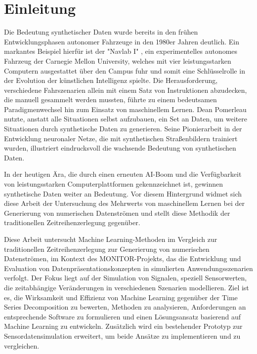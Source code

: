 
\chapter{Einleitung}
Die Bedeutung synthetischer Daten wurde bereits in den frühen Entwicklungsphasen autonomer Fahrzeuge in den 1980er Jahren deutlich. 
Ein markantes Beispiel hierfür ist der "Navlab I" \cite{NeuralNe96:online}, ein experimentelles autonomes Fahrzeug der Carnegie Mellon University, welches mit vier leistungsstarken Computern ausgestattet 
über den Campus fuhr und somit eine Schlüsselrolle in der Evolution der künstlichen Intelligenz spielte. Die Herausforderung, verschiedene Fahrszenarien allein mit einem Satz von Instruktionen abzudecken, 
die manuell gesammelt werden mussten, führte zu einem bedeutsamen Paradigmenwechsel hin zum Einsatz von maschinellem Lernen. Dean Pomerleau nutzte, anstatt alle Situationen selbst aufzubauen, ein Set an Daten, 
um weitere Situationen durch synthetische Daten zu generieren. Seine Pionierarbeit in der Entwicklung neuronaler Netze, die mit synthetischen Straßenbildern trainiert wurden, illustriert eindrucksvoll die wachsende Bedeutung von synthetischen Daten.

In der heutigen Ära, die durch einen erneuten AI-Boom und die Verfügbarkeit von leistungsstarken Computerplattformen gekennzeichnet ist, gewinnen synthetische Daten weiter an Bedeutung. Vor diesem Hintergrund widmet 
sich diese Arbeit der Untersuchung des Mehrwerts von maschinellem Lernen bei der Generierung von numerischen Datenströmen und stellt diese Methodik der traditionellen Zeitreihenzerlegung gegenüber.

Diese Arbeit untersucht Machine Learning-Methoden im Vergleich zur traditionellen Zeitreihenzerlegung zur Generierung von numerischen Datenströmen, im Kontext des MONITOR-Projekts, das die Entwicklung und Evaluation 
von Datenpräsentationskonzepten in simulierten Anwendungsszenarien verfolgt. Der Fokus liegt auf der Simulation von Signalen, speziell Sensorwerten, die zeitabhängige Veränderungen in verschiedenen Szenarien modellieren. 
Ziel ist es, die Wirksamkeit und Effizienz von Machine Learning gegenüber der Time Series Decomposition zu bewerten, Methoden zu analysieren, Anforderungen an entsprechende Software zu formulieren und einen Lösungsansatz 
basierend auf Machine Learning zu entwickeln. Zusätzlich wird ein bestehender Prototyp zur Sensordatensimulation erweitert, um beide Ansätze zu implementieren und zu vergleichen.

